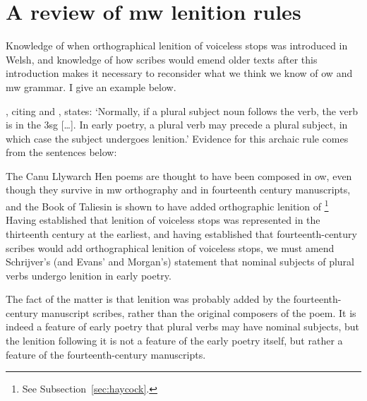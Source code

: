 \section{A review of \gls{mw} lenition rules}
\label{sec:cons-other-ideas}
Knowledge of when orthographical lenition of voiceless stops was introduced in Welsh, and knowledge of how scribes would emend older texts after this introduction makes it necessary to reconsider what we think we know of \gls{ow} and \gls{mw} grammar. I give an example below.

\Textcite[2]{schrijver_free_2010}, citing \textcite[18, 179]{evans_grammar_1964} and \textcite[193n]{morgan_y_1952}, states:
`Normally, if a plural subject noun follows the verb, the verb is in the 3sg [\dots]. In early poetry, a plural verb may precede a plural subject, in which case the subject undergoes lenition.' Evidence for this archaic rule comes from the sentences below:
\begin{mwl}
\end{mwl}

The Canu Llywarch Hen poems are thought to have been composed in \gls{ow}, even though they survive in \gls{mw} orthography and in fourteenth century manuscripts, and the Book of Taliesin is shown to have added orthographic lenition of \footnote{See Subsection~\ref{sec:haycock}.} Having established that  lenition of voiceless stops was represented in the thirteenth century at the earliest, and having established that fourteenth-century scribes would add orthographical lenition of voiceless stops, we must amend Schrijver's (and Evans' and Morgan's) statement that nominal subjects of plural verbs undergo lenition in early poetry.

The fact of the matter is that lenition was probably added by the fourteenth-century manuscript scribes, rather than the original composers of the poem. It is indeed a feature of early poetry that plural verbs may have nominal subjects, but the lenition following it is not a feature of the early poetry itself, but rather a feature of the fourteenth-century manuscripts.


